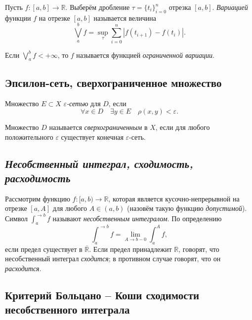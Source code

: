 \begin{definition}
	Пусть \(f \colon [a, b] \to \mathbb{R}\). Выберём дробление \(\tau = \{t_i\}_{i = 0}^n\) отрезка \([a, b]\). \textit{Вариацией}  функции \(f\) на отрезке \([a, b]\) называется величина \[
		\bigvee_a^b f = \sup_\tau \sum_{i = 0}^n |f(t_{i + 1}) - f(t_i)|.
	\]
\end{definition}

\begin{remark}
	Если \(\bigvee\limits_a^b f < +\infty\), то \(f\) называется функцией \textit{ограниченной вариации}.
\end{remark}

\subsection{Эпсилон-сеть, сверхограниченное множество}

\begin{ndefinition}
	Множество \(E \subset X\)  \textit{\(\varepsilon\)-сетью} для \(D\), если \[
		\forall x \in D \quad \exists y \in E \quad \rho(x, y) < \varepsilon.
	\]
\end{ndefinition}

\begin{ndefinition}
	Множество \(D\) называется \textit{сверхограниченным} в \(X\), если для любого положительного \(\varepsilon\) существует конечная \(\varepsilon\)-сеть.
\end{ndefinition}

\subsection{\itshape Несобственный интеграл, сходимость, расходимость}

\begin{definition}
	Рассмотрим функцию \(f \colon [a, b) \to \mathbb{R}\), которая является кусочно-непрерывной на отрезке \([a, A]\) для любого \(A \in (a, b)\) (назовём такую функцию \textit{допустимой}). Символ \(\int_a^{\to b} f\) называют \textit{несобственным интегралом}. По определению \[
		\int_a^{\to b} f = \lim_{A \to b - 0} \int_a^A f,
	\]
	если предел существует в \(\overline{\mathbb{R}}\). Если предел принадлежит \(\mathbb{R}\), говорят, что несобственный интеграл \textit{сходится}; в противном случае говорят, что он \textit{расходится}.
\end{definition}

\subsection{Критерий Больцано -- Коши сходимости несобственного интеграла}

